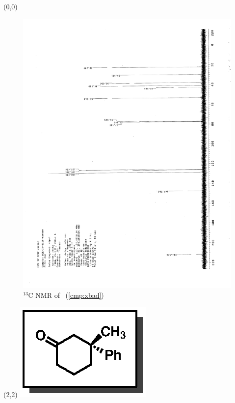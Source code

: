 \clearpage
\begin{textblock}{20}(0,0)
\begin{figure}[htb]
\caption{$^{13}$C NMR of  \CMPxbad\ (\ref{cmp:xbad})}
\includegraphics[scale=0.75, trim = 0mm 0mm 0mm 5mm,
clip]{chp_singlecarbon/images/nmr/xbadC}
\vspace{-100pt}
\end{figure}
\end{textblock}
\begin{textblock}{1}(2,2)
\includegraphics[scale=0.8, angle=90]{chp_singlecarbon/images/xbad}
\end{textblock}
\clearpage


